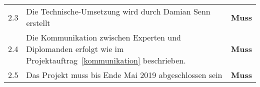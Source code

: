 \begin{longtable}[]{@{}llc@{}}
  2.3  & Die Technische-Umsetzung wird durch Damian Senn erstellt                                                                         & \textbf{Muss}\tabularnewline
  2.4  & \makecell[l]{Die Kommunikation zwischen Experten und Diplomanden erfolgt wie im                                                                                 \\ Projektauftrag~\ref{kommunikation} beschrieben.} & \textbf{Muss}\tabularnewline
  2.5  & Das Projekt muss bis Ende Mai 2019 abgeschlossen sein                                                                            & \textbf{Muss}\tabularnewline
  \bottomrule
\end{longtable}
